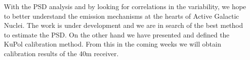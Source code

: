 \documentclass[a0paper,portrait]{baposter}
\begin{document}
\begin{poster}
{\small{ With the PSD analysis and by looking for correlations in the variability, we hope to better understand the emission mechanisms at the hearts of Active Galactic Nuclei. The work is under development and we are in search of the best method to estimate the PSD. On the other hand we have presented and defined the KuPol calibration method. From this in the coming weeks we will obtain calibration results of the 40m receiver. }
}

\end{poster}
\end{document}
